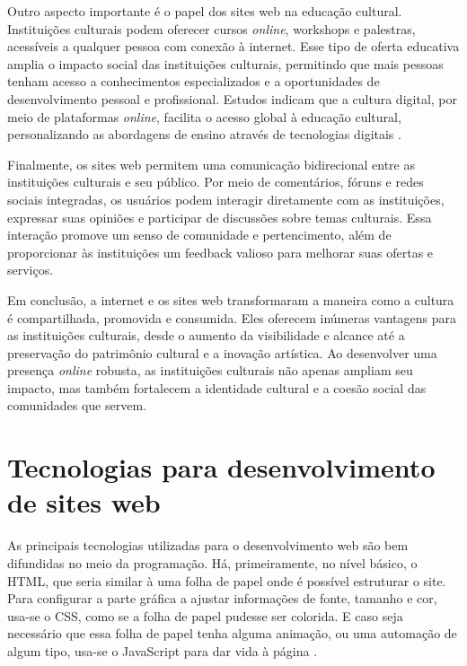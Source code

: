 Outro aspecto importante é o papel dos sites web na educação cultural. Instituições culturais podem oferecer cursos \textit{online}, workshops e palestras, acessíveis a qualquer pessoa com conexão à internet. Esse tipo de oferta educativa amplia o impacto social das instituições culturais, permitindo que mais pessoas tenham acesso a conhecimentos especializados e a oportunidades de desenvolvimento pessoal e profissional. Estudos indicam que a cultura digital, por meio de plataformas \textit{online}, facilita o acesso global à educação cultural, personalizando as abordagens de ensino através de tecnologias digitais \cite{xiong2019}.

Finalmente, os sites web permitem uma comunicação bidirecional entre as instituições culturais e seu público. Por meio de comentários, fóruns e redes sociais integradas, os usuários podem interagir diretamente com as instituições, expressar suas opiniões e participar de discussões sobre temas culturais. Essa interação promove um senso de comunidade e pertencimento, além de proporcionar às instituições um feedback valioso para melhorar suas ofertas e serviços.

Em conclusão, a internet e os sites web transformaram a maneira como a cultura é compartilhada, promovida e consumida. Eles oferecem inúmeras vantagens para as instituições culturais, desde o aumento da visibilidade e alcance até a preservação do patrimônio cultural e a inovação artística. Ao desenvolver uma presença \textit{online} robusta, as instituições culturais não apenas ampliam seu impacto, mas também fortalecem a identidade cultural e a coesão social das comunidades que servem.

\section{Tecnologias para desenvolvimento de sites web}

As principais tecnologias utilizadas para o desenvolvimento web são bem difundidas no meio da programação. Há, primeiramente, no nível básico, o \ac{HTML}, que seria similar à uma folha de papel onde é possível estruturar o site. Para configurar a parte gráfica a ajustar informações de fonte, tamanho e cor, usa-se o \ac{CSS}, como se a folha de papel pudesse ser colorida. E caso seja necessário que essa folha de papel tenha alguma animação, ou uma automação de algum tipo, usa-se o JavaScript para dar vida à página \cite{W3C}.

